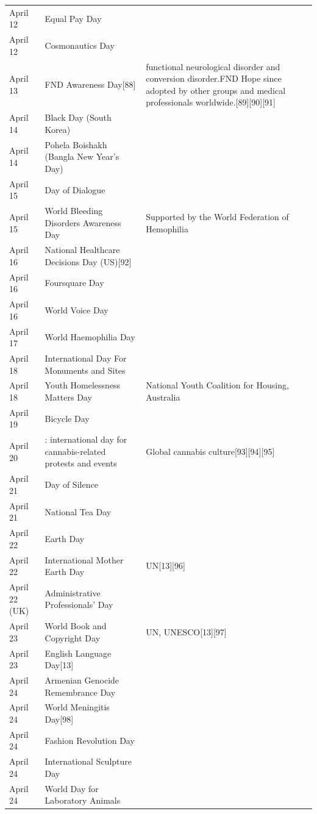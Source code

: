 \documentclass[
  openany]{book}
\begin{document}
\begin{longtable}[t]{>{\raggedright\arraybackslash}p{8em}>{\raggedright\arraybackslash}p{20em}>{\raggedright\arraybackslash}p{12em}}
April 12 & Equal Pay Day & \\
April 12 & Cosmonautics Day & \\
\addlinespace
April 13 & FND Awareness Day[88] & functional neurological disorder and conversion disorder.FND Hope since adopted by other groups and medical professionals worldwide.[89][90][91]\\
April 14 & Black Day (South Korea) & \\
April 14 & Pohela Boishakh (Bangla New Year's Day) & \\
April 15 & Day of Dialogue & \\
April 15 & World Bleeding Disorders Awareness Day & Supported by the World Federation of Hemophilia\\
\addlinespace
April 16 & National Healthcare Decisions Day (US)[92] & \\
April 16 & Foursquare Day & \\
April 16 & World Voice Day & \\
April 17 & World Haemophilia Day & \\
April 18 & International Day For Monuments and Sites & \\
\addlinespace
April 18 & Youth Homelessness Matters Day & National Youth Coalition for Housing, Australia\\
April 19 & Bicycle Day & \\
April 20 & 420: international day for cannabis-related protests and events & Global cannabis culture[93][94][95]\\
April 21 & Day of Silence & \\
April 21 & National Tea Day & \\
\addlinespace
April 22 & Earth Day & \\
April 22 & International Mother Earth Day & UN[13][96]\\
April 22 (UK) & Administrative Professionals' Day & \\
April 23 & World Book and Copyright Day & UN, UNESCO[13][97]\\
April 23 & English Language Day[13] & \\
\addlinespace
April 24 & Armenian Genocide Remembrance Day & \\
April 24 & World Meningitis Day[98] & \\
April 24 & Fashion Revolution Day & \\
April 24 & International Sculpture Day & \\
April 24 & World Day for Laboratory Animals & \\

\end{longtable}
\end{document}

